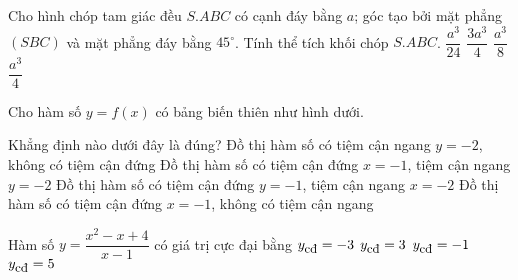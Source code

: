\begin{ex}%
Cho hình chóp tam giác đều $S.ABC$ có cạnh đáy bằng $a$; góc tạo bởi mặt phẳng $(SBC)$ và mặt phẳng đáy bằng $45^\circ$. Tính thể tích khối chóp $S.ABC$.
\choice
{\True $\dfrac{a^3}{24}$}
{$\dfrac{3a^3}{4}$}
{$\dfrac{a^3}{8}$}
{$\dfrac{a^3}{4}$}
\end{ex} 

\begin{ex}%
Cho hàm số $y=f(x)$ có bảng biến thiên như hình dưới.
\begin{center}
\end{center}
Khẳng định nào dưới đây là đúng?
\choice
{Đồ thị hàm số có tiệm cận ngang $y=-2$, không có tiệm cận đứng}
{\True Đồ thị hàm số có tiệm cận đứng $x=-1$, tiệm cận ngang $y=-2$}
{Đồ thị hàm số có tiệm cận đứng $y=-1$, tiệm cận ngang $x=-2$}
{Đồ thị hàm số có tiệm cận đứng $x=-1$, không có tiệm cận ngang}
\loigiai{
}
\end{ex}

\begin{ex}%
Hàm số $y=\dfrac{x^2-x+4}{x-1}$ có giá trị cực đại bằng
\choice
{\True $y_{\small\mbox{cđ}}=-3$}
{$y_{\small\mbox{cđ}}=3$}
{$y_{\small\mbox{cđ}}=-1$}
{$y_{\small\mbox{cđ}}=5$}
\end{ex}

